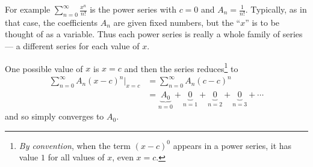 For example $\sum_{n=0}^\infty \frac{x^n}{n!}$ is the power series
with $c=0$ and $A_n=\frac{1}{n!}$. Typically, as in that case,
the coefficients $A_n$ are given fixed numbers,
but the ``$x$'' is to be thought of as a variable.
Thus each power series is really a whole family of series ---
a different series for each value of $x$.

One possible value of $x$ is $x=c$ and then the series reduces\footnote{\emph{By convention}, when the term $(x-c)^0$
appears in a power series, it has value $1$ for all values of $x$,
even $x=c$.} to
\begin{align*}
\sum_{n=0}^\infty A_n (x-c)^n\Big|_{x=c}
 &=\sum_{n=0}^\infty A_n (c-c)^n\\
&=\underbrace{A_0}_{n=0}
+\underbrace{0}_{n=1}
+\underbrace{0}_{n=2}
+\underbrace{0}_{n=3}
+\cdots
\end{align*}
and so simply converges to $A_0$.

